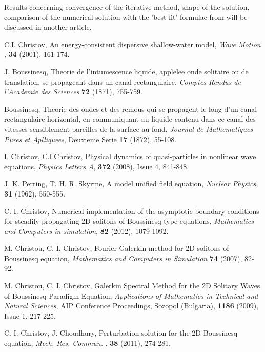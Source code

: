 \documentclass[12pt]{article}
\theoremstyle{theorem}
\theoremstyle{defi}
\begin{document}
Results concerning convergence of the iterative method, shape of the solution, comparison of the numerical solution with the 'best-fit' formulae from \cite{ref10} will be discussed in another article.


\begin{thebibliography}{99} \normalsize

 C.I. Christov, An energy-consistent dispersive shallow-water model,  {\it Wave Motion }, \textbf{34} (2001), 161-174.

 J. Boussinesq, %
Theorie de l’intumescence liquide, applelee onde solitaire ou de translation, se propageant dans un canal rectangulaire, %
{\it Comptes Rendus de l’Academie des Sciences} \textbf{72} (1871), 755-759.

 Boussinesq, 
Theorie des ondes et des remous qui se propagent le long d’un canal rectangulaire horizontal, 
en communiquant au liquide contenu dans ce canal des vitesses sensiblement pareilles de la surface au fond,
{\it Journal de Mathematiques Pures et Aplliquees}, Deuxieme Serie \textbf{17} (1872), 55-108.

 I. Christov, C.I.Christov, Physical dynamics of quasi-particles in nonlinear wave equations,
{\it Physics Letters A}, \textbf{372} (2008), Issue 4, 841-848.

 J. K. Perring, T. H. R. Skyrme, A model unified field equation, {\it Nuclear Physics},  \textbf{31} (1962), 550-555.

  C. I. Christov, 
Numerical implementation of the asymptotic boundary conditions for steadily propagating 2D solitons of Boussinesq type equations, 
{\it Mathematics and Computers in simulation}, \textbf{82} (2012), 1079-1092.

  M. Christou, C. I. Christov, 
Fourier Galerkin method for 2D solitons of Boussinesq equation, 
{\it Mathematics and Computers in Simulation} \textbf{74} (2007), 82-92.

   M. Christou, C. I. Christov, 
Galerkin Spectral Method for the 2D Solitary Waves of Boussinesq Paradigm Equation, 
{\it Applications of Mathematics in Technical and Natural Sciences},
AIP Conference Proceedings, Sozopol (Bulgaria), \textbf{1186} (2009), Issue 1, 217-225.

 C. I. Christov, J. Choudhury, Perturbation solution for the 2D Boussinesq equation, {\it Mech. Res. Commun. }, \textbf{38} (2011), 274-281.


\end{thebibliography}
\end{document}
